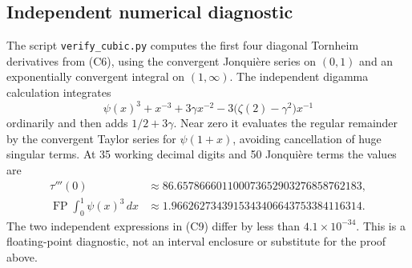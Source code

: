 \subsection{Independent numerical diagnostic}

The script \texttt{verify\_cubic.py} computes the first four diagonal
Tornheim derivatives from (C6), using the convergent Jonqui\`ere series
on $(0,1)$ and an exponentially convergent integral on $(1,\infty)$.
The independent digamma calculation integrates
\[
 \psi(x)^3+x^{-3}+3\gamma x^{-2}
                -3\bigl(\zeta(2)-\gamma^2\bigr)x^{-1}
\]
ordinarily and then adds $1/2+3\gamma$. Near zero it evaluates the
regular remainder by the convergent Taylor series for $\psi(1+x)$,
avoiding cancellation of huge singular terms.
At 35 working decimal digits and 50 Jonqui\`ere terms the values are
\begin{align*}
 \tau'''(0)&\approx86.657866601100073652903276858762183,\\
 \operatorname{FP}\int_0^1\psi(x)^3\,dx
 &\approx1.9662627343915343406643753384116314.
\end{align*}
The two independent expressions in (C9) differ by less than
$4.1\times10^{-34}$. This is a floating-point diagnostic, not an
interval enclosure or substitute for the proof above.

